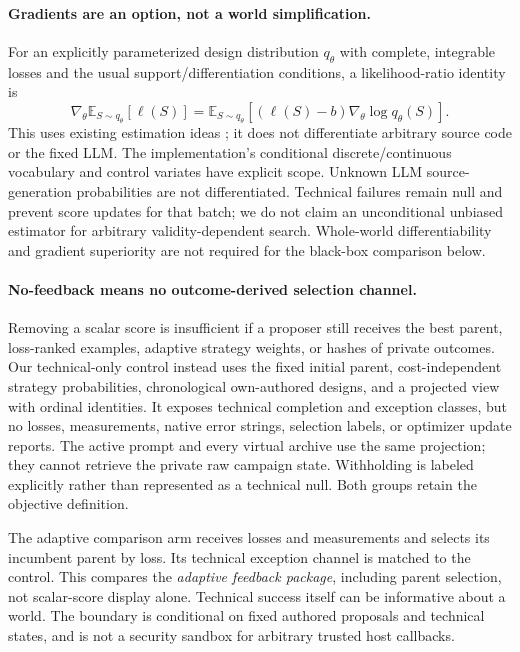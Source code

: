 \documentclass{article}
\begin{document}
\paragraph{Gradients are an option, not a world simplification.}
For an explicitly parameterized design distribution $q_\theta$ with complete,
integrable losses and the usual support/differentiation conditions, a
likelihood-ratio identity is
\begin{equation}
 \nabla_\theta\mathbb{E}_{S\sim q_\theta}[\ell(S)]
 =\mathbb{E}_{S\sim q_\theta}[(\ell(S)-b)\nabla_\theta\log q_\theta(S)].
 \label{eq:lr}
\end{equation}
This uses existing estimation ideas \citep{parmas2021unified}; it does not
differentiate arbitrary source code or the fixed LLM. The implementation's
conditional discrete/continuous vocabulary and control variates have explicit
scope. Unknown LLM source-generation probabilities are not differentiated.
Technical failures remain null and prevent score updates for that batch; we
do not claim an unconditional unbiased estimator for arbitrary validity-dependent
search. Whole-world differentiability and gradient superiority are not required
for the black-box comparison below.

\paragraph{No-feedback means no outcome-derived selection channel.}
Removing a scalar score is insufficient if a proposer still receives the best
parent, loss-ranked examples, adaptive strategy weights, or hashes of private
outcomes. Our technical-only control instead uses the fixed initial parent,
cost-independent strategy probabilities, chronological own-authored designs,
and a projected view with ordinal identities. It exposes technical completion
and exception classes, but no losses, measurements, native error strings,
selection labels, or optimizer update reports. The active prompt and every
virtual archive use the same projection; they cannot retrieve the private raw
campaign state. Withholding is labeled explicitly rather than represented as a
technical null. Both groups retain the objective definition.

The adaptive comparison arm receives losses and measurements and selects its
incumbent parent by loss. Its technical exception channel is matched to the
control. This compares the \emph{adaptive feedback package}, including parent
selection, not scalar-score display alone. Technical success itself can be
informative about a world. The boundary is conditional on fixed authored
proposals and technical states, and is not a security sandbox for arbitrary
trusted host callbacks.
\end{document}
